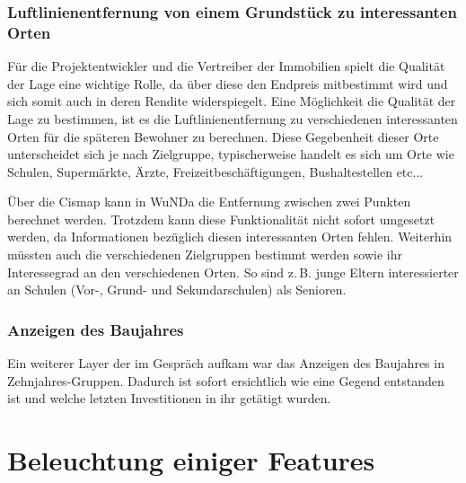 \subsubsection{Luftlinienentfernung von einem Grundstück zu interessanten Orten}
Für die Projektentwickler und die Vertreiber der Immobilien spielt die Qualität der Lage eine wichtige Rolle, da über diese den Endpreis mitbestimmt wird und sich somit auch in deren Rendite widerspiegelt.
Eine Möglichkeit die Qualität der Lage zu bestimmen, ist es die Luftlinienentfernung zu verschiedenen interessanten Orten für die späteren Bewohner zu berechnen.
Diese Gegebenheit dieser Orte unterscheidet sich je nach Zielgruppe, typischerweise handelt es sich um Orte wie Schulen, Supermärkte, Ärzte, Freizeitbeschäftigungen, Bushaltestellen etc...

Über die Cismap kann in \ac{WuNDa} die Entfernung zwischen zwei Punkten berechnet werden.
Trotzdem kann diese Funktionalität nicht sofort umgesetzt werden, da Informationen bezüglich diesen interessanten Orten fehlen.
Weiterhin müssten auch die verschiedenen Zielgruppen bestimmt werden sowie ihr Interessegrad an den verschiedenen Orten.
So sind z.\,B. junge Eltern interessierter an Schulen (Vor-, Grund- und Sekundarschulen) als Senioren.

\subsubsection{Anzeigen des Baujahres}
Ein weiterer Layer der im Gespräch aufkam war das Anzeigen des Baujahres in Zehnjahres-Gruppen.
Dadurch ist sofort ersichtlich wie eine Gegend entstanden ist und welche letzten Investitionen in ihr getätigt wurden.


\section{Beleuchtung einiger Features}

